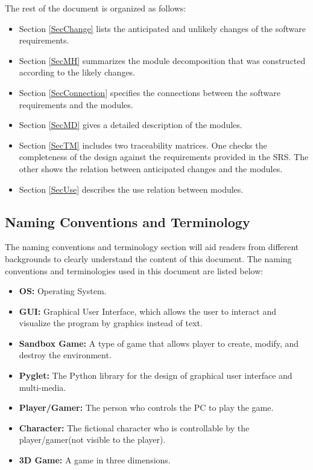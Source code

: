 \documentclass[12pt, titlepage]{article}
\begin{document}
The rest of the document is organized as follows:
\begin{itemize}

\item Section \ref{SecChange} lists the anticipated and unlikely changes of the software
requirements. 
\item Section \ref{SecMH} summarizes the module decomposition that
was constructed according to the likely changes. 
\item Section \ref{SecConnection}
specifies the connections between the software requirements and the
modules. 
\item Section \ref{SecMD} gives a detailed description of the
modules. 
\item Section \ref{SecTM} includes two traceability matrices. One checks
the completeness of the design against the requirements provided in the SRS. The
other shows the relation between anticipated changes and the modules. 
\item Section
\ref{SecUse} describes the use relation between modules.
\end{itemize}


\subsection{Naming Conventions and Terminology}
The naming conventions and terminology section will aid readers from different backgrounds to clearly understand the content of this document. The naming conventions and terminologies used in this document are listed below:
\begin{itemize}
        \item \textbf{OS:} Operating System.
        \item \textbf{GUI:} Graphical User Interface, which allows the user to interact and visualize the program by graphics instead of text.
        \item \textbf{Sandbox Game:} A type of game that allows player to create, modify, and destroy the environment.
        \item \textbf{Pyglet:} The Python library for the design of graphical user interface and multi-media.
        \item \textbf{Player/Gamer:} The person who controls the PC to play the game.
        \item \textbf{Character:} The fictional character who is controllable by the player/gamer(not visible to the player).
        \item \textbf{3D Game:} A game in three dimensions.
\end{itemize}
\end{document}
